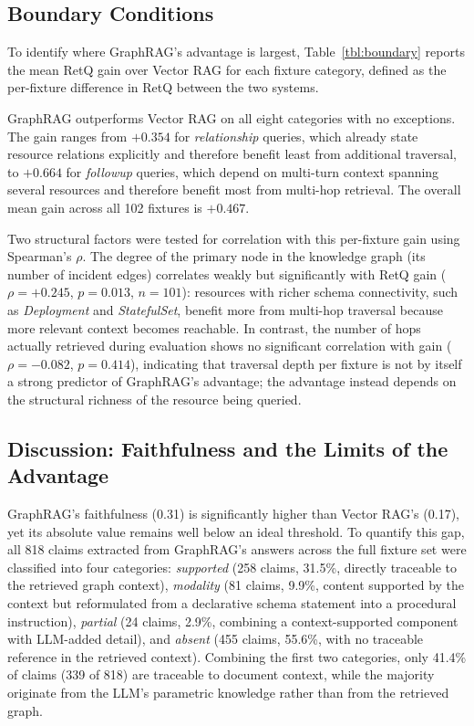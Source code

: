 \documentclass{ieeeaccess}
\begin{document}
\subsection{Boundary Conditions}

To identify where GraphRAG's advantage is largest, Table~\ref{tbl:boundary} reports the mean RetQ gain over Vector RAG for each fixture category, defined as the per-fixture difference in RetQ between the two systems.



GraphRAG outperforms Vector RAG on all eight categories with no exceptions. The gain ranges from $+0.354$ for \textit{relationship} queries, which already state resource relations explicitly and therefore benefit least from additional traversal, to $+0.664$ for \textit{followup} queries, which depend on multi-turn context spanning several resources and therefore benefit most from multi-hop retrieval. The overall mean gain across all 102 fixtures is $+0.467$.

Two structural factors were tested for correlation with this per-fixture gain using Spearman's $\rho$. The degree of the primary node in the knowledge graph (its number of incident edges) correlates weakly but significantly with RetQ gain ($\rho=+0.245$, $p=0.013$, $n=101$): resources with richer schema connectivity, such as \textit{Deployment} and \textit{StatefulSet}, benefit more from multi-hop traversal because more relevant context becomes reachable. In contrast, the number of hops actually retrieved during evaluation shows no significant correlation with gain ($\rho=-0.082$, $p=0.414$), indicating that traversal depth per fixture is not by itself a strong predictor of GraphRAG's advantage; the advantage instead depends on the structural richness of the resource being queried.

\subsection{Discussion: Faithfulness and the Limits of the Advantage}

GraphRAG's faithfulness (0.31) is significantly higher than Vector RAG's (0.17), yet its absolute value remains well below an ideal threshold. To quantify this gap, all 818 claims extracted from GraphRAG's answers across the full fixture set were classified into four categories: \textit{supported} (258 claims, 31.5\%, directly traceable to the retrieved graph context), \textit{modality} (81 claims, 9.9\%, content supported by the context but reformulated from a declarative schema statement into a procedural instruction), \textit{partial} (24 claims, 2.9\%, combining a context-supported component with LLM-added detail), and \textit{absent} (455 claims, 55.6\%, with no traceable reference in the retrieved context). Combining the first two categories, only 41.4\% of claims (339 of 818) are traceable to document context, while the majority originate from the LLM's parametric knowledge rather than from the retrieved graph.
\end{document}
